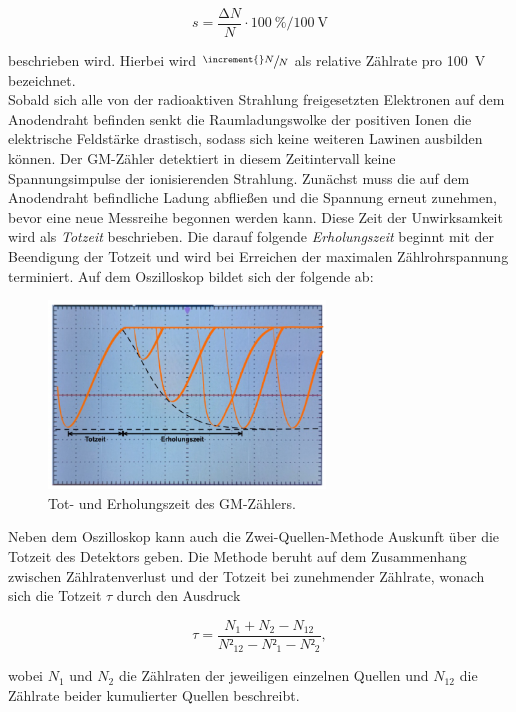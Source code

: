 \begin{equation}
\label{eqn:mPlateau}
    s = \frac{\increment{}N}{N}\cdot{}\qty{100}{\percent} / \qty{100}{\volt}
\end{equation}

\noindent beschrieben wird. Hierbei wird $\sfrac{\increment{}N}{N}$ als relative Zählrate pro \qty{100}{\volt} bezeichnet.\\

\noindent Sobald sich alle von der radioaktiven Strahlung freigesetzten Elektronen auf dem Anodendraht befinden senkt die 
Raumladungswolke der positiven Ionen die elektrische Feldstärke drastisch, sodass sich keine weiteren Lawinen ausbilden können.
Der GM-Zähler detektiert in diesem Zeitintervall keine Spannungsimpulse der ionisierenden Strahlung. Zunächst muss die auf dem 
Anodendraht befindliche Ladung abfließen und die Spannung erneut zunehmen, bevor eine neue Messreihe begonnen werden kann. Diese 
Zeit der Unwirksamkeit wird als \emph{Totzeit} beschrieben. Die darauf folgende \emph{Erholungszeit} beginnt mit der 
Beendigung der Totzeit und wird bei Erreichen der maximalen Zählrohrspannung terminiert. Auf dem Oszilloskop bildet sich der 
folgende ab:

\begin{figure}[H]
    \centering
    \includegraphics[height=5cm]{content/Totzeit.png}
    \caption{Tot- und Erholungszeit des GM-Zählers\cite{Versuchsanleitung_v703}.}
    \label{fig:Totzeit}
\end{figure}

\noindent Neben dem Oszilloskop kann auch die Zwei-Quellen-Methode Auskunft über die Totzeit des Detektors geben.
Die Methode beruht auf dem Zusammenhang zwischen Zählratenverlust und der Totzeit bei zunehmender Zählrate, wonach 
sich die Totzeit $\tau$ durch den Ausdruck 

\begin{equation}
\label{eqn:Totzeit}
    \tau = \frac{N_1 + N_2 - N_{12}}{N²_{12} - N²_1 - N²_2},
\end{equation}

\noindent wobei $N_1$ und $N_2$ die Zählraten der jeweiligen einzelnen Quellen und $N_{12}$ die Zählrate beider kumulierter Quellen 
beschreibt.

%